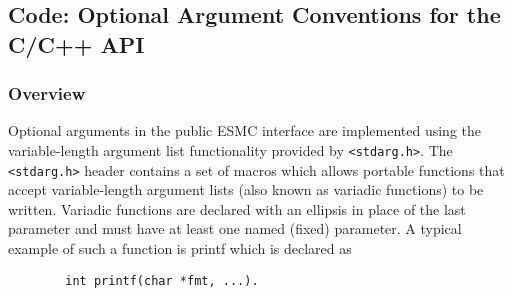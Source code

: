 
\subsection{Code: Optional Argument Conventions for the C/C++ API}


\subsubsection{Overview}

Optional arguments in the public ESMC interface are implemented using the
variable-length argument list functionality provided by \texttt{<stdarg.h>}.
The \texttt{<stdarg.h>} header contains a set of macros which allows portable
functions that accept variable-length argument lists (also known as variadic
functions) to be written. Variadic functions are declared with an ellipsis in
place of the last parameter and must have at least one named (fixed) parameter.
A typical example of such a function is printf which is declared as

\begin{verbatim}
        int printf(char *fmt, ...).
\end{verbatim}

